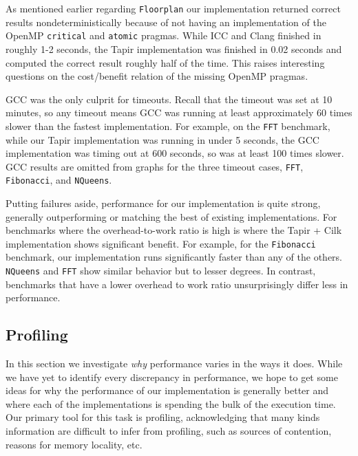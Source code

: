 \documentclass[sigconf]{acmart}
\begin{document}
As mentioned earlier regarding \texttt{Floorplan} our implementation returned correct
results nondeterministically because of not having an implementation of the OpenMP
\texttt{critical} and \texttt{atomic} pragmas. While ICC and Clang finished in
roughly 1-2 seconds, the Tapir implementation was finished in 0.02 seconds
and computed the correct result roughly half of the time. This raises interesting
questions on the cost/benefit relation of the missing OpenMP pragmas.

GCC was the only culprit for timeouts. Recall that the timeout was set at 10
minutes, so any timeout means GCC was running at least approximately 60 times
slower than the fastest implementation. For example, on the \texttt{FFT}
benchmark, while our Tapir implementation was running in under 5 seconds, the
GCC implementation was timing out at 600 seconds, so was at least 100 times
slower. GCC results are omitted from graphs for the three timeout cases,
\texttt{FFT}, \texttt{Fibonacci}, and \texttt{NQueens}.

Putting failures aside, performance for our implementation is quite strong,
generally outperforming or matching the best of existing implementations. For
benchmarks where the overhead-to-work ratio is high is where the Tapir + Cilk
implementation shows significant benefit. For example, for the
\texttt{Fibonacci} benchmark, our implementation runs significantly faster than
any of the others. \texttt{NQueens} and \texttt{FFT} show similar behavior but
to lesser degrees. In contrast, benchmarks that have a lower overhead to work
ratio unsurprisingly differ less in performance.

\subsection{Profiling}

In this section we investigate \emph{why} performance varies in the ways it
does. While we have yet to identify every discrepancy in performance, we hope
to get some ideas for why the performance of our implementation is generally
better and where each of the implementations is spending the bulk of the
execution time. Our primary tool for this task is profiling, acknowledging
that many kinds information are difficult to infer from profiling, such as sources
of contention, reasons for memory locality, etc.
\end{document}
